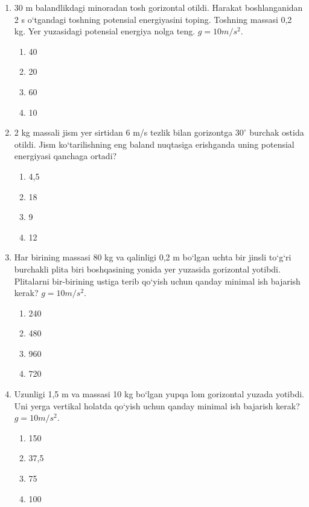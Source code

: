 \begin{enumerate}
\section{Potensial energiya va ish}

\item 30 m balandlikdagi minoradan tosh gorizontal otildi. Harakat boshlanganidan 2 s o‘tgandagi toshning potensial energiyasini toping. Toshning massasi 0,2 kg. Yer yuzasidagi potensial energiya nolga teng. $g = 10 m/s^2$.
\begin{enumerate}[label=\Alph*)]
\item 40
\item 20
\item 60
\item 10
\end{enumerate}

\item 2 kg massali jism yer sirtidan 6 m/s tezlik bilan gorizontga $30^\circ$ burchak ostida otildi. Jism ko‘tarilishning eng baland nuqtasiga erishganda uning potensial energiyasi qanchaga ortadi?
\begin{enumerate}[label=\Alph*)]
\item 4,5
\item 18
\item 9
\item 12
\end{enumerate}

\item Har birining massasi 80 kg va qalinligi 0,2 m bo‘lgan uchta bir jinsli to‘g‘ri burchakli plita biri boshqasining yonida yer yuzasida gorizontal yotibdi. Plitalarni bir-birining ustiga terib qo‘yish uchun qanday minimal ish bajarish kerak? $g = 10 m/s^2$.
\begin{enumerate}[label=\Alph*)]
\item 240
\item 480
\item 960
\item 720
\end{enumerate}

\item Uzunligi 1,5 m va massasi 10 kg bo‘lgan yupqa lom gorizontal yuzada yotibdi. Uni yerga vertikal holatda qo‘yish uchun qanday minimal ish bajarish kerak? $g = 10 m/s^2$.
\begin{enumerate}[label=\Alph*)]
\item 150
\item 37,5
\item 75
\item 100
\end{enumerate}


\end{enumerate}

